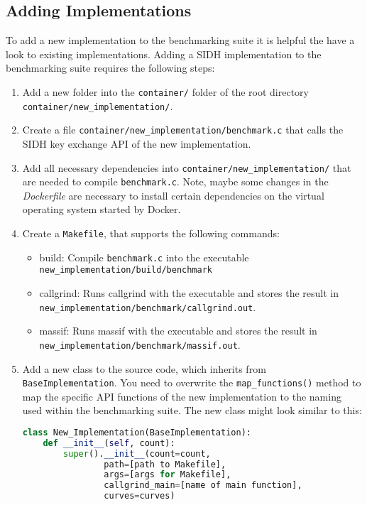 \subsection{Adding Implementations}
To add a new implementation to the benchmarking suite it is helpful the have a look to existing implementations. Adding a SIDH implementation to the benchmarking suite requires the following steps:
\begin{enumerate}
\item Add a new folder into the \texttt{container/} folder of the root directory \\ \texttt{container/new\_implementation/}.
\item Create a file \texttt{container/new\_implementation/benchmark.c} that calls the SIDH key exchange API of the new implementation.
\item Add all necessary dependencies into \texttt{container/new\_implementation/} that are needed to compile \texttt{benchmark.c}. Note, maybe some changes in the \textit{Dockerfile} are necessary to install certain dependencies on the virtual operating system started by Docker.
\item Create a \texttt{Makefile}, that supports the following commands:
	\begin{itemize}
		\item build: Compile \texttt{benchmark.c} into the executable \\ \texttt{new\_implementation/build/benchmark}
		\item callgrind: Runs callgrind with the executable and stores the result in\\ \texttt{new\_implementation/benchmark/callgrind.out}.
		\item massif: Runs massif with the executable and stores the result in\\ \texttt{new\_implementation/benchmark/massif.out}.
	\end{itemize}
\item Add a new class to the source code, which inherits from \texttt{BaseImplementation}. You need to overwrite the \texttt{map\_functions()} method to map the specific API functions of the new implementation to the naming used within the benchmarking suite. The new class might look similar to this:

\begin{lstlisting}[language=Python]
class New_Implementation(BaseImplementation):
    def __init__(self, count):
        super().__init__(count=count,
				path=[path to Makefile], 
				args=[args for Makefile],
				callgrind_main=[name of main function],
				curves=curves)


\end{lstlisting}
\end{enumerate}

